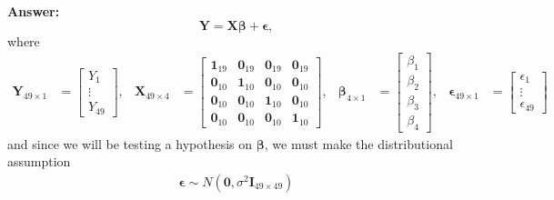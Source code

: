 \documentclass[
]{article}
\newenvironment{Shaded}{\begin{snugshade}}{\end{snugshade}}
\newcommand{\CommentTok}[1]{\textcolor[rgb]{0.56,0.35,0.01}{\textit{#1}}}
\newcommand{\DecValTok}[1]{\textcolor[rgb]{0.00,0.00,0.81}{#1}}
\newcommand{\FunctionTok}[1]{\textcolor[rgb]{0.00,0.00,0.00}{#1}}
\newcommand{\NormalTok}[1]{#1}
\newcommand{\OtherTok}[1]{\textcolor[rgb]{0.56,0.35,0.01}{#1}}
\newcommand{\SpecialCharTok}[1]{\textcolor[rgb]{0.00,0.00,0.00}{#1}}
\newcommand{\StringTok}[1]{\textcolor[rgb]{0.31,0.60,0.02}{#1}}
\newcommand{\bmI}{\ensuremath{\bm I}}
\newcommand{\bmX}{\ensuremath{\bm X}}
\newcommand{\bmY}{\ensuremath{\bm Y}}
\newcommand{\bmbeta}{\ensuremath{\bm{\beta}}}
\newcommand{\bmepsilon}{\ensuremath{\bm{\epsilon}}}
\begin{document}
\textbf{Answer:} \[\bmY = \bmX\bmbeta + \bmepsilon,\] where
\begin{align*}
\bmY_{49\times 1} &= 
\begin{bmatrix} 
Y_1 \\ 
\vdots \\ 
Y_49 
\end{bmatrix},
& \bmX_{49\times 4} &=
\begin{bmatrix}
\bm1_{19} & \bm0_{19} & \bm0_{19} & \bm0_{19} \\
\bm0_{10} & \bm1_{10} & \bm0_{10} & \bm0_{10} \\
\bm0_{10} & \bm0_{10} & \bm1_{10} & \bm0_{10} \\
\bm0_{10} & \bm0_{10} & \bm0_{10} & \bm1_{10}
\end{bmatrix},
& \bmbeta_{4\times 1} &= 
\begin{bmatrix}
\beta_1 \\
\beta_2 \\
\beta_3 \\
\beta_4
\end{bmatrix},
& \bmepsilon_{49\times 1} &=
\begin{bmatrix}
\epsilon_1 \\
\vdots \\
\epsilon_{49}
\end{bmatrix}
\end{align*} and since we will be testing a hypothesis on \(\bmbeta\),
we must make the distributional assumption \begin{align*}
\bmepsilon \sim N(\bm0, \sigma^2\bmI_{49\times 49})
\end{align*}

\begin{Shaded}
\end{Shaded}
\end{document}
